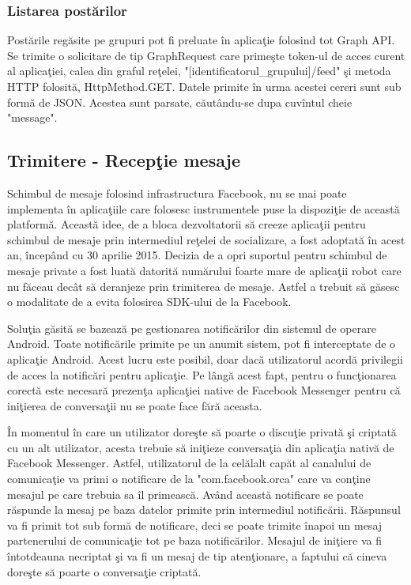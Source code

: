 \subsubsection{Listarea post\u{a}rilor}

Post\u{a}rile reg\u{a}site pe grupuri pot fi preluate \^{i}n aplica\c{t}ie folosind tot Graph API. Se trimite o solicitare de tip GraphRequest care prime\c{s}te token-ul de acces curent al aplica\c{t}iei,  calea din graful re\c{t}elei, "[identificatorul_grupului]/feed" \c{s}i metoda HTTP folosit\u{a}, HttpMethod.GET. Datele primite \^{i}n urma acestei cereri sunt sub form\u{a} de JSON. Acestea sunt parsate, c\u{a}ut\^{a}ndu-se dupa cuv\^{i}ntul cheie "message".

\subsection{Trimitere - Recep\c{t}ie mesaje}

Schimbul de mesaje folosind infrastructura Facebook, nu se mai poate implementa \^{i}n aplica\c{t}iile care folosesc instrumentele puse la dispozi\c{t}ie de aceast\u{a} platform\u{a}. Aceast\u{a} idee, de a bloca dezvoltatorii s\u{a} creeze aplica\c{t}ii pentru schimbul de mesaje prin intermediul re\c{t}elei de socializare, a fost adoptat\u{a} \^{i}n acest an, \^{i}ncep\^{a}nd cu 30 aprilie 2015. Decizia de a opri suportul pentru schimbul de mesaje private a fost luat\u{a} datorit\u{a} num\u{a}rului foarte mare de aplica\c{t}ii robot care nu f\u{a}ceau dec\^{a}t s\u{a} deranjeze prin trimiterea de mesaje. Astfel a trebuit s\u{a} g\u{a}sesc o modalitate de a evita folosirea SDK-ului de la Facebook.

Solu\c{t}ia g\u{a}sit\u{a} se bazeaz\u{a} pe gestionarea notific\u{a}rilor din sistemul de operare Android. Toate notific\u{a}rile primite pe un anumit sistem, pot fi interceptate de o aplica\c{t}ie Android. Acest lucru este posibil, doar dac\u{a} utilizatorul acord\u{a} privilegii de acces la notific\u{a}ri pentru aplica\c{t}ie. Pe l\^{a}ng\u{a} acest fapt, pentru o func\c{t}ionarea corect\u{a} este necesar\u{a} prezen\c{t}a aplica\c{t}iei native de Facebook Messenger pentru c\u{a} ini\c{t}ierea de conversa\c{t}ii nu se poate face f\u{a}r\u{a} aceasta.

\^{I}n momentul \^{i}n care un utilizator dore\c{s}te s\u{a} poarte o discu\c{t}ie privat\u{a} \c{s}i criptat\u{a} cu un alt utilizator, acesta trebuie s\u{a} ini\c{t}ieze conversa\c{t}ia din aplica\c{t}ia nativ\u{a} de Facebook Messenger. Astfel, utilizatorul de la cel\u{a}lalt cap\u{a}t al canalului de comunica\c{t}ie va primi o notificare de la "com.facebook.orca" care va con\c{t}ine mesajul pe care trebuia sa \^{i}l primeasc\u{a}. Av\^{a}nd aceast\u{a} notificare se poate r\u{a}spunde la mesaj pe baza datelor primite prin intermediul notific\u{a}rii. R\u{a}spunsul va fi primit tot sub form\u{a} de notificare, deci se poate trimite \^{i}napoi un mesaj partenerului de comunica\c{t}ie tot pe baza notific\u{a}rilor. Mesajul de ini\c{t}iere va fi \^{i}ntotdeauna necriptat \c{s}i va fi un mesaj de tip aten\c{t}ionare, a faptului c\u{a} cineva dore\c{s}te s\u{a} poarte o conversa\c{t}ie criptat\u{a}.

